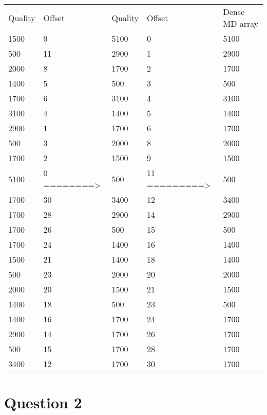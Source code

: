 \documentclass[a4paper,12pt]{article}
\begin{document}
\begin{Large}
\begin{center}
\begin{tabular}{lllll}
Quality & Offset &   Quality & Offset &Dense MD array\\
  1500   &  9   &  5100   &  0   &  5100 \\
  500   &  11    & 2900   &  1  &   2900\\
  2000   &  8   &  1700   &  2     &1700\\
  1400   &  5   &  500   &  3     &500\\
  1700   &  6   &  3100   &  4    & 3100\\
  3100   &  4    & 1400   &  5    & 1400\\
  2900   &  1   &  1700   &  6    &   1700\\
  500   &  3     &  2000   &  8   &  2000\\
  1700   &  2    & 1500   &  9    & 1500\\
  5100   &  0   ========> &  500   &  11  =========> &   500\\ 
  1700   &  30    &  3400   &  12 &   3400\\ 
  1700   &  28    &  2900   &  14 &    2900\\
  1700   &  26    &  500   &  15   & 500\\
  1700   &  24    &  1400    &  16  &  1400 \\
  1500   &  21     &  1400   &  18  &     1400\\
  500   &  23      &  2000   &  20  &    2000\\
  2000   &  20    &  1500   &  21   &     1500\\
  1400   &  18    &  500   &  23    &  500\\
  1400    &  16     &  1700   &  24 &   1700\\
  2900   &  14     &  1700   &  26  &    1700\\
  500   &  15      &  1700   &  28    &  1700\\
  3400   &  12    &  1700   &  30 &   1700\\

\end{tabular}
\end{center}
\end{Large}

\newpage
\section*{Question 2}
\end{document}
